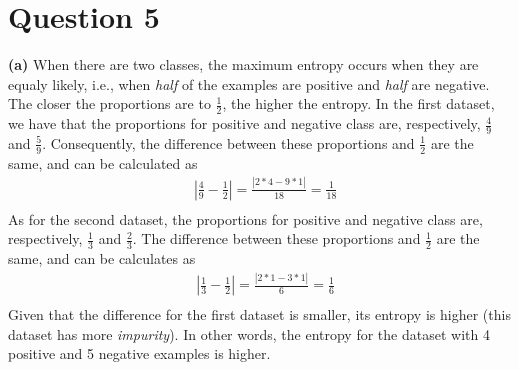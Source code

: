 \documentclass[leqno]{article}
\begin{document}
\hfill

\section*{Question 5} \textbf{(a)} When there are two classes, the maximum entropy occurs when they are equaly likely, i.e., 
when \textit{half} of the examples are positive and \textit{half} are negative. The closer the proportions are to $\frac{1}{2}$, 
the higher the entropy. In the first dataset, we have that the proportions for positive and negative class are, respectively, 
$\frac{4}{9}$ and $\frac{5}{9}$. Consequently, the difference between these proportions and $\frac{1}{2}$ are the same, and can 
be calculated as
\begin{equation*}
\begin{split}
&|\frac{4}{9} - \frac{1}{2}| = \frac{|2*4 - 9*1|}{18} = \frac{1}{18} \\
\end{split}
\end{equation*}
As for the second dataset, the proportions for positive and negative class are, respectively, $\frac{1}{3}$ and $\frac{2}{3}$. 
The difference between these proportions and $\frac{1}{2}$ are the same, and can be calculates as 
\begin{equation*}
\begin{split}
&|\frac{1}{3} - \frac{1}{2}| = \frac{|2*1 - 3*1|}{6} = \frac{1}{6} \\
\end{split}
\end{equation*}
Given that the difference for the first dataset is smaller, its entropy is higher (this dataset has more 
\textit{impurity}). In other words, the entropy for the dataset with 4 positive and 
5 negative examples is higher.

\hfill
\end{document}

